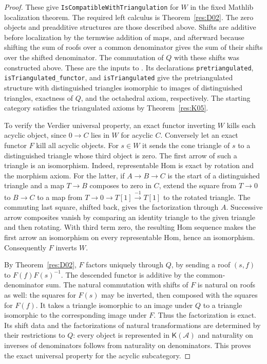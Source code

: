 \begin{proof}
These give \texttt{IsCompatibleWithTriangulation} for \(W\) in the
fixed Mathlib localization theorem. The required left calculus is
Theorem~\ref{res:D02}. The zero objects and preadditive structures
are those described above. Shifts are additive before localization
by the termwise addition of maps, and afterward because shifting
the sum of roofs over a common denominator gives the sum of their
shifts over the shifted denominator. The commutation of \(Q\) with
these shifts was constructed above. These are the inputs to
\cite[\texttt{CategoryTheory.Triangulated.Localization}]{mathlib-triangulated}.
Its declarations \texttt{pretriangulated},
\texttt{isTriangulated\_functor}, and \texttt{isTriangulated}
give the pretriangulated structure with distinguished triangles
isomorphic to images of distinguished triangles, exactness of
\(Q\), and the octahedral axiom, respectively. The starting
category satisfies the triangulated axioms by Theorem~\ref{res:K05}.

To verify the Verdier universal property, an exact functor
inverting \(W\) kills each acyclic object, since \(0\to C\) lies
in \(W\) for acyclic \(C\). Conversely let an exact functor \(F\)
kill all acyclic objects. For \(s\in W\) it sends the cone
triangle of \(s\) to a distinguished triangle whose third
object is zero. The first arrow of such a triangle is an
isomorphism. Indeed, representable Hom is exact by rotation and
the morphism axiom. For the latter, if \(A\to B\to C\) is the start
of a distinguished triangle and a map \(T\to B\) composes to zero
in \(C\), extend the square from \(T\to0\) to \(B\to C\) to a
map from \(T\to0\to T[1]\xrightarrow{-1}T[1]\) to the rotated
triangle. The commuting last square, shifted back, gives the
factorization through \(A\). Successive arrow composites vanish
by comparing an identity triangle to the given triangle and then
rotating. With third term zero, the resulting Hom sequence makes
the first arrow an isomorphism on every representable Hom, hence
an isomorphism. Consequently \(F\) inverts \(W\).

By Theorem~\ref{res:D02}, \(F\) factors uniquely through \(Q\), by
sending a roof \((s,f)\) to \(F(f)F(s)^{-1}\). The descended
functor is additive by the common-denominator sum. The natural
commutation with shifts of \(F\) is natural on roofs as well:
the squares for \(F(s)\) may be inverted, then composed with the
squares for \(F(f)\). It takes a triangle isomorphic to an image
under \(Q\) to a triangle isomorphic to the corresponding image
under \(F\). Thus the factorization is exact. Its shift data and
the factorizations of natural transformations are determined by
their restrictions to \(Q\): every object is represented in
\(\mathsf K(\mathcal A)\) and naturality on inverses of denominators
follows from naturality on denominators. This proves the exact
universal property for the acyclic subcategory.


\end{proof}
